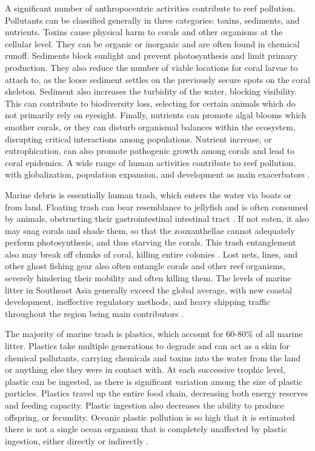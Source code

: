 \documentclass{book}\usepackage{knitr}
\begin{document}
A significant number of anthropocentric activities contribute to reef pollution. Pollutants can be classified generally in three categories: toxins, sediments, and nutrients. Toxins cause physical harm to corals and other organisms at the cellular level. They can be organic or inorganic and are often found in chemical runoff. Sediments block sunlight and prevent photosynthesis and limit primary production. They also reduce the number of viable locations for coral larvae to attach to, as the loose sediment settles on the previously secure spots on the coral skeleton. Sediment also increases the turbidity of the water, blocking visibility. This can contribute to biodiversity loss, selecting for certain animals which do not primarily rely on eyesight. Finally, nutrients can promote algal blooms which smother corals, or they can disturb organismal balances within the ecosystem, disrupting critical interactions among populations. Nutrient increase, or eutrophication, can also promote pathogenic growth among corals and lead to coral epidemics. A wide range of human activities contribute to reef pollution, with globalization, population expansion, and development as main exacerbators \citep{4884777420100401}.

Marine debris is essentially human trash, which enters the water via boats or from land. Floating trash can bear resemblance to jellyfish and is often consumed by animals, obstructing their gastrointestinal intestinal tract \citep{coralreefalliance_2021}. If not eaten, it also may snag corals and shade them, so that the zooxanthellae cannot adequately perform photosynthesis, and thus starving the corals. This trash entanglement also may break off chunks of coral, killing entire colonies \citep{USEPA_2017}. Lost nets, lines, and other ghost fishing gear also often entangle corals and other reef organisms, severely hindering their mobility and often killing them. The levels of marine litter in Southeast Asia generally exceed the global average, with new coastal development, ineffective regulatory methods, and heavy shipping traffic throughout the region being main contributors \citep{4884777420100401}.

The majority of marine trash is plastics, which account for 60-80\% of all marine litter. Plastics take multiple generations to degrade and can act as a skin for chemical pollutants, carrying chemicals and toxins into the water from the land or anything else they were in contact with. At each successive trophic level, plastic can be ingested, as there is significant variation among the size of plastic particles. Plastics travel up the entire food chain, decreasing both energy reserves and feeding capacity. Plastic ingestion also decreases the ability to produce offspring, or fecundity. Oceanic plastic pollution is so high that it is estimated there is not a single ocean organism that is completely unaffected by plastic ingestion, either directly or indirectly \citep{12907334620180601}.
\end{document}
